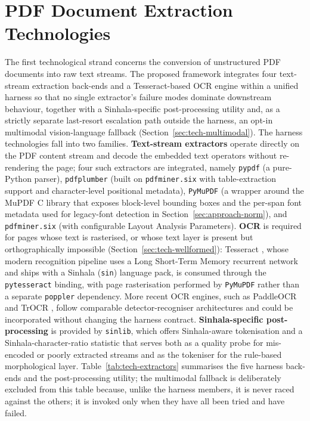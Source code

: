 \documentclass[12pt,a4paper,oneside]{report}
\begin{document}
\section{PDF Document Extraction Technologies}
\label{sec:tech-extraction}
The first technological strand concerns the conversion of unstructured PDF documents into raw text streams. The proposed framework integrates four text-stream extraction back-ends and a Tesseract-based OCR engine within a unified harness so that no single extractor's failure modes dominate downstream behaviour, together with a Sinhala-specific post-processing utility and, as a strictly separate last-resort escalation path outside the harness, an opt-in multimodal vision-language fallback (Section~\ref{sec:tech-multimodal}). The harness technologies fall into two families. \textbf{Text-stream extractors} operate directly on the PDF content stream and decode the embedded text operators without re-rendering the page; four such extractors are integrated, namely \texttt{pypdf} (a pure-Python parser), \texttt{pdfplumber} (built on \texttt{pdfminer.six} with table-extraction support and character-level positional metadata), \texttt{PyMuPDF} (a wrapper around the MuPDF C library that exposes block-level bounding boxes and the per-span font metadata used for legacy-font detection in Section~\ref{sec:approach-norm}), and \texttt{pdfminer.six} (with configurable Layout Analysis Parameters). \textbf{OCR} is required for pages whose text is rasterised, or whose text layer is present but orthographically impossible (Section~\ref{sec:tech-wellformed}): Tesseract \cite{smith2007tesseract}, whose modern recognition pipeline uses a Long Short-Term Memory recurrent network \cite{hochreiter1997lstm} and ships with a Sinhala (\texttt{sin}) language pack, is consumed through the \texttt{pytesseract} binding, with page rasterisation performed by \texttt{PyMuPDF} rather than a separate \texttt{poppler} dependency. More recent OCR engines, such as PaddleOCR \cite{du2020paddleocr} and TrOCR \cite{li2023trocr}, follow comparable detector-recogniser architectures and could be incorporated without changing the harness contract. \textbf{Sinhala-specific post-processing} is provided by \texttt{sinlib}, which offers Sinhala-aware tokenisation and a Sinhala-character-ratio statistic that serves both as a quality probe for mis-encoded or poorly extracted streams and as the tokeniser for the rule-based morphological layer. Table~\ref{tab:tech-extractors} summarises the five harness back-ends and the post-processing utility; the multimodal fallback is deliberately excluded from this table because, unlike the harness members, it is never raced against the others; it is invoked only when they have all been tried and have failed.
\end{document}
